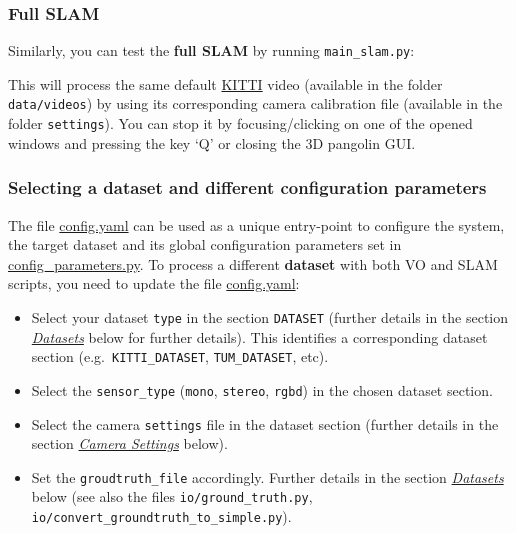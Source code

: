 \documentclass{article}
\newenvironment{Shaded}{\begin{snugshade}}{\end{snugshade}}
\newcommand{\BuiltInTok}[1]{\textcolor[rgb]{0.74,0.68,0.62}{#1}}
\newcommand{\CommentTok}[1]{\textcolor[rgb]{0.00,0.40,1.00}{\textbf{\textit{#1}}}}
\newcommand{\ExtensionTok}[1]{\textcolor[rgb]{0.74,0.68,0.62}{#1}}
\newcommand{\NormalTok}[1]{\textcolor[rgb]{0.74,0.68,0.62}{#1}}
\begin{document}
\hypertarget{full-slam}{%
\subsubsection{Full SLAM}\label{full-slam}}

Similarly, you can test the \textbf{full SLAM} by running
\texttt{main\_slam.py}:\\

\begin{scriptsize}
\begin{Shaded}
\end{Shaded}
\end{scriptsize}

This will process the same default
\href{(http://www.cvlibs.net/datasets/kitti/eval_odometry.php)}{KITTI}
video (available in the folder \texttt{data/videos}) by using its
corresponding camera calibration file (available in the folder
\texttt{settings}). You can stop it by focusing/clicking on one of the
opened windows and pressing the key `Q' or closing the 3D pangolin GUI.
\hypertarget{selecting-a-dataset-and-different-configuration-parameters}{%
\subsubsection{Selecting a dataset and different configuration
parameters}\label{selecting-a-dataset-and-different-configuration-parameters}}

The file \href{./config.yaml}{config.yaml} can be used as a unique
entry-point to configure the system, the target dataset and its global
configuration parameters set in
\href{./config_parameters.py}{config\_parameters.py}.
To process a different \textbf{dataset} with both VO and SLAM scripts,
you need to update the file \href{./config.yaml}{config.yaml}:
\begin{itemize}
\item Select
your dataset \texttt{type} in the section \texttt{DATASET} (further
details in the section \emph{\protect\hyperlink{datasets}{Datasets}}
below for further details). This identifies a corresponding dataset
section (e.g.~\texttt{KITTI\_DATASET}, \texttt{TUM\_DATASET}, etc). 
\item  Select the \texttt{sensor\_type} (\texttt{mono}, \texttt{stereo},
\texttt{rgbd}) in the chosen dataset section.
\item  Select the camera \texttt{settings} file in the dataset section
(further details in the section
\emph{\protect\hyperlink{camera-settings}{Camera Settings}} below).
\item Set the \texttt{groudtruth\_file} accordingly. Further details in the
section \emph{\protect\hyperlink{datasets}{Datasets}} below (see also
the files \texttt{io/ground\_truth.py},
\texttt{io/convert\_groundtruth\_to\_simple.py}).
\end{itemize}
\end{document}

